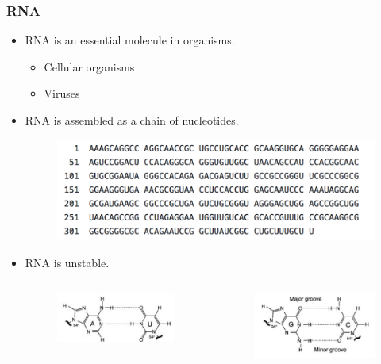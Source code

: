 \documentclass{beamer}
\begin{document}
\begin{frame}
\frametitle{RNA}
\begin{itemize}
\item RNA is an essential molecule in organisms.
\begin{itemize}
\item Cellular organisms
\item Viruses
\end{itemize}
\item RNA is assembled as a chain of nucleotides. 
\begin{figure}
	\includegraphics[width=0.8\linewidth]{RNASequence}
	\centering
\end{figure}
\item RNA is unstable. 
\begin{columns}[c]
\begin{figure}
	\includegraphics[width=0.8\linewidth]{AUBasePair}
	\centering
\end{figure}
\begin{figure}
	\includegraphics[width=0.8\linewidth]{GCBasePair}
	\centering
\end{figure}
\end{columns}
\end{itemize}
\end{frame}
\end{document}
